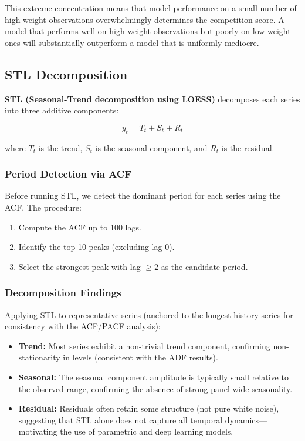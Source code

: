 This extreme concentration means that model performance on a small number of high-weight observations overwhelmingly determines the competition score. A model that performs well on high-weight observations but poorly on low-weight ones will substantially outperform a model that is uniformly mediocre.

\subsection{STL Decomposition}

\textbf{STL (Seasonal-Trend decomposition using LOESS)} decomposes each series into three additive components:

\begin{equation}
y_t = T_t + S_t + R_t
\end{equation}

where $T_t$ is the trend, $S_t$ is the seasonal component, and $R_t$ is the residual.

\subsubsection{Period Detection via ACF}

Before running STL, we detect the dominant period for each series using the ACF. The procedure:
\begin{enumerate}
    \item Compute the ACF up to 100 lags.
    \item Identify the top 10 peaks (excluding lag 0).
    \item Select the strongest peak with lag $\geq 2$ as the candidate period.
\end{enumerate}

\subsubsection{Decomposition Findings}

Applying STL to representative series (anchored to the longest-history series for consistency with the ACF/PACF analysis):

\begin{itemize}
    \item \textbf{Trend:} Most series exhibit a non-trivial trend component, confirming non-stationarity in levels (consistent with the ADF results).
    \item \textbf{Seasonal:} The seasonal component amplitude is typically small relative to the observed range, confirming the absence of strong panel-wide seasonality.
    \item \textbf{Residual:} Residuals often retain some structure (not pure white noise), suggesting that STL alone does not capture all temporal dynamics---motivating the use of parametric and deep learning models.
\end{itemize}

